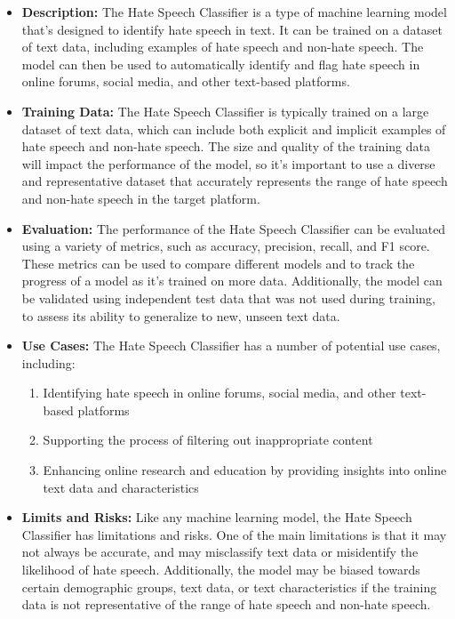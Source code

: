 \begin{itemize}
\begin{itemize}
    \item \textbf{Description:} The Hate Speech Classifier is a type of machine learning model that's designed to identify hate speech in text. It can be trained on a dataset of text data, including examples of hate speech and non-hate speech. The model can then be used to automatically identify and flag hate speech in online forums, social media, and other text-based platforms.
    \item \textbf{Training Data:} The Hate Speech Classifier is typically trained on a large dataset of text data, which can include both explicit and implicit examples of hate speech and non-hate speech. The size and quality of the training data will impact the performance of the model, so it's important to use a diverse and representative dataset that accurately represents the range of hate speech and non-hate speech in the target platform.
    \item \textbf{Evaluation:} The performance of the Hate Speech Classifier can be evaluated using a variety of metrics, such as accuracy, precision, recall, and F1 score. These metrics can be used to compare different models and to track the progress of a model as it's trained on more data. Additionally, the model can be validated using independent test data that was not used during training, to assess its ability to generalize to new, unseen text data.
    \item \textbf{Use Cases:} The Hate Speech Classifier has a number of potential use cases, including:
        \begin{enumerate}  
            \item Identifying hate speech in online forums, social media, and other text-based platforms
            \item Supporting the process of filtering out inappropriate content
            \item Enhancing online research and education by providing insights into online text data and characteristics
        \end{enumerate}
    \item \textbf{Limits and Risks:} Like any machine learning model, the Hate Speech Classifier has limitations and risks. One of the main limitations is that it may not always be accurate, and may misclassify text data or misidentify the likelihood of hate speech. Additionally, the model may be biased towards certain demographic groups, text data, or text characteristics if the training data is not representative of the range of hate speech and non-hate speech.

\end{itemize}
\end{itemize}
